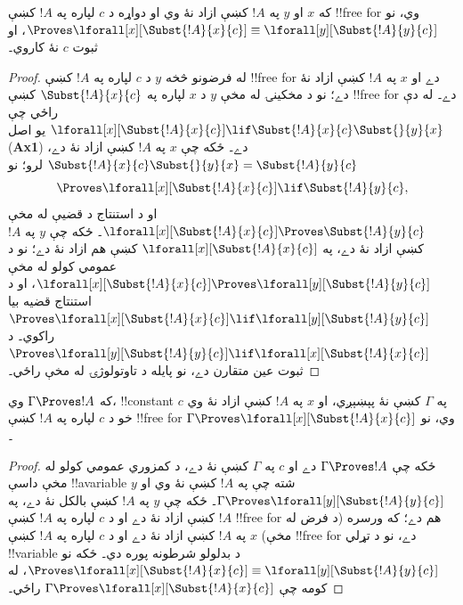 \documentclass[../../../include/open-logic-section]{subfiles}
\begin{document}
\begin{lem}
که $x$ او $y$ په $!A$ کښې ازاد نۀ وي او دواړه د $c$ لپاره په $!A$ کښې !!{free for} وي، نو $\Proves \lforall[x][\Subst{!A}{x}{c}] \equiv
\lforall[y][\Subst{!A}{y}{c}]$، او ثبوت $c$ نۀ کاروي۔
\end{lem}

\begin{proof}
له فرضونو څخه $y$ د $c$ لپاره په $!A$ کښې !!{free for} دے او $x$ په $!A$ کښې ازاد نۀ دے؛ نو د مخکينۍ  له مخې $y$ د $x$ لپاره په $\Subst{!A}{x}{c}$ کښې !!{free for} دے۔ له دې راځي چې
$\lforall[x][\Subst{!A}{x}{c}] \lif \Subst{!A}{x}{c} \Subst{}{y}{x}$
يو اصل (\textbf{Ax1}) دے۔ ځکه چې $x$ په $!A$ کښې ازاد نۀ دے، $\Subst{!A}{x}{c} \Subst{}{y}{x} = \Subst{!A}{y}{c}$ لرو؛ نو
\[
\Proves \lforall[x][\Subst{!A}{x}{c}] \lif \Subst{!A}{y}{c},
\]
او د استنتاج د قضيې له مخې $\lforall[x][\Subst{!A}{x}{c}] \Proves
\Subst{!A}{y}{c}$۔ ځکه چې $y$ په $!A$ کښې ازاد نۀ دے، په $\lforall[x][\Subst{!A}{x}{c}]$ کښې هم ازاد نۀ دے؛ نو د عمومي کولو له مخې
$\lforall[x][\Subst{!A}{x}{c}] \Proves \lforall[y][\Subst{!A}{y}{c}]$،
او د استنتاج قضيه بيا $\Proves
\lforall[x][\Subst{!A}{x}{c}] \lif \lforall[y][\Subst{!A}{y}{c}]$ راکوي۔ د $\Proves \lforall[y][\Subst{!A}{y}{c}] \lif \lforall[x]
[\Subst{!A}{x}{c}]$ ثبوت عين متقارن دے، نو پايله د تاوتولوژۍ له مخې راځي۔
\end{proof}

\begin{thm}
که $\Gamma \Proves !A$ وي، !!{constant} $c$ په $\Gamma$ کښې نۀ پېښېږي، او $x$ په $!A$ کښې ازاد نۀ وي خو د $c$ لپاره په $!A$ کښې !!{free for} وي، نو $\Gamma \Proves \lforall[x][\Subst{!A}{x}{c}]$۔
\end{thm}

\begin{proof}
ځکه چې $\Gamma \Proves !A$ دے او $c$ په $\Gamma$ کښې نۀ دے، د کمزوري عمومي کولو له مخې داسې !!a{variable} $y$ شته چې په $!A$ کښې نۀ وي او $\Gamma \Proves \lforall[y][\Subst{!A}{y}{c}]$۔ ځکه چې $y$ په $!A$ کښې بالکل نۀ دے، په $!A$ کښې ازاد نۀ دے او د $c$ لپاره په $!A$ کښې !!{free for} هم دے؛ که ورسره (د فرض له مخې) $x$ په $!A$ کښې ازاد نۀ دے او د $c$ لپاره په $!A$ کښې !!{free for} دے، نو د تړلي !!{variable} د بدلولو شرطونه پوره دي۔ ځکه نو $\Proves \lforall[x][\Subst{!A}{x}{c}] \equiv
\lforall[y][\Subst{!A}{y}{c}]$، له کومه چې $\Gamma \Proves
\lforall[x][\Subst{!A}{x}{c}]$ راځي۔
\end{proof}
\end{document}
